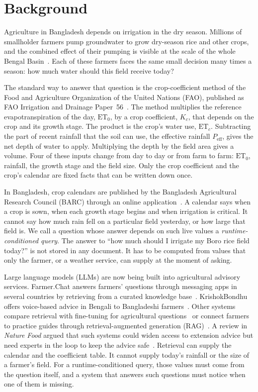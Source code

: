 \section{Background}
\label{sec:background}

Agriculture in Bangladesh depends on irrigation in the dry season. Millions of smallholder farmers pump groundwater to grow dry-season rice and other crops, and the combined effect of their pumping is visible at the scale of the whole Bengal Basin~\cite{shamsudduha2022bengal}. Each of these farmers faces the same small decision many times a season: how much water should this field receive today?

The standard way to answer that question is the crop-coefficient method of the Food and Agriculture Organization of the United Nations (FAO), published as FAO Irrigation and Drainage Paper~56~\cite{allen1998fao56}. The method multiplies the reference evapotranspiration of the day, $\mathrm{ET}_0$, by a crop coefficient, $K_c$, that depends on the crop and its growth stage. The product is the crop's water use, $\mathrm{ET}_c$. Subtracting the part of recent rainfall that the soil can use, the effective rainfall $P_\mathrm{eff}$, gives the net depth of water to apply. Multiplying the depth by the field area gives a volume. Four of these inputs change from day to day or from farm to farm: $\mathrm{ET}_0$, rainfall, the growth stage and the field size. Only the crop coefficient and the crop's calendar are fixed facts that can be written down once.

In Bangladesh, crop calendars are published by the Bangladesh Agricultural Research Council (BARC) through an online application~\cite{barc2026cropcalendar}. A calendar says when a crop is sown, when each growth stage begins and when irrigation is critical. It cannot say how much rain fell on a particular field yesterday, or how large that field is. We call a question whose answer depends on such live values a \emph{runtime-conditioned query}. The answer to ``how much should I irrigate my Boro rice field today?'' is not stored in any document. It has to be computed from values that only the farmer, or a weather service, can supply at the moment of asking.

Large language models (LLMs) are now being built into agricultural advisory services. Farmer.Chat answers farmers' questions through messaging apps in several countries by retrieving from a curated knowledge base~\cite{singh2024farmerchat}. KrishokBondhu offers voice-based advice in Bengali to Bangladeshi farmers~\cite{krishokbondhu2025}. Other systems compare retrieval with fine-tuning for agricultural questions~\cite{balaguer2024rag} or connect farmers to practice guides through retrieval-augmented generation (RAG)~\cite{samuel2025agrollm}. A review in \emph{Nature Food} argued that such systems could widen access to extension advice but need experts in the loop to keep the advice safe~\cite{tzachor2023large}. Retrieval can supply the calendar and the coefficient table. It cannot supply today's rainfall or the size of a farmer's field. For a runtime-conditioned query, those values must come from the question itself, and a system that answers such questions must notice when one of them is missing.

